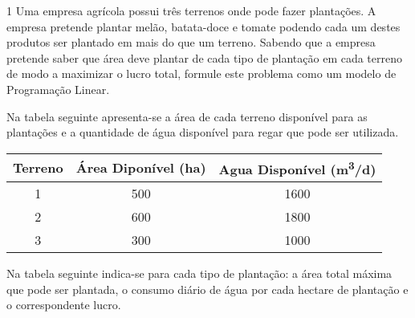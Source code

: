 \documentclass[\mainfilename]{subfiles}
\begin{document}
\begin{questionBox}1{ %
    Uma empresa agrícola possui três terrenos onde pode fazer plantações. A empresa pretende plantar melão, batata-doce e tomate podendo cada um destes produtos ser plantado em mais do que um terreno. Sabendo que a empresa pretende saber que área deve plantar de cada tipo de plantação em cada terreno de modo a maximizar o lucro total, formule este problema como um modelo de Programação Linear.
} %

    Na tabela seguinte apresenta-se a área de cada terreno disponível para as plantações e a quantidade de água disponível para regar que pode ser utilizada.
    \begin{center}
        \vspace{1ex}
        \begin{tabular}{*{3}{c}}
            
            \toprule
            
                \multicolumn{1}{c}{Terreno}
                &\multicolumn{1}{c}{Área Diponível (ha)}
                &\multicolumn{1}{c}{Agua Disponível (\unit{\metre^3/\day})}
            
            \\\midrule
            
                1    & 500 & 1600
                \\ 2 & 600 & 1800
                \\ 3 & 300 & 1000
            
            \\\bottomrule
            
        \end{tabular}
        \vspace{2ex}
    \end{center}

    Na tabela seguinte indica-se para cada tipo de plantação: a área total máxima que pode ser plantada, o consumo diário de água por cada hectare de plantação e o correspondente lucro.
    \begin{center}
        \vspace{-1ex}
        \setlength\tabcolsep{3mm}        %
        \renewcommand\arraystretch{1.25} %
        \begin{tabular}{l *{3}{c}}
            \toprule
            

\end{tabular}
\end{center}
\end{questionBox}
\end{document}
